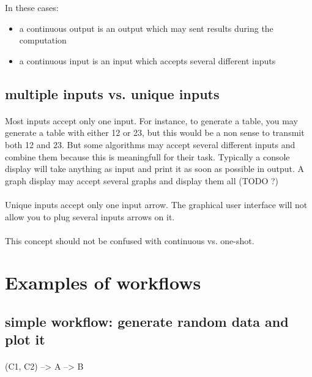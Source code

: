 \documentclass[a4paper,10pt]{book}
\begin{document}
In these cases:
\begin{itemize}
\item a continuous output is an output which may sent results during the computation
\item a continuous input is an input which accepts several different inputs
\end{itemize}

\subsection{multiple inputs vs. unique inputs}

\paragraph*{}
Most inputs accept only one input. For instance, to generate a table, you may generate a table with either 12 or 23, but this would be a non sense to transmit both 12 and 23. 
But some algorithms may accept several different inputs and combine them because this is meaningfull for their task. Typically a console display will take anything as input and print it as soon as possible in output. A graph display may accept several graphs and display them all (TODO ?)

\paragraph*{}
Unique inputs accept only one input arrow. The graphical user interface will not allow you to plug several inputs arrows on it.


\paragraph*{}
This concept should not be confused with continuous vs. one-shot.


\section{Examples of workflows}

\subsection{simple workflow: generate random data and plot it}

\paragraph*{}
(C1, C2) --> A --> B
\end{document}
